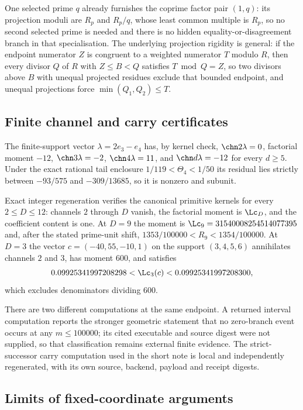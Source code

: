 One selected prime $q$ already furnishes the coprime factor pair $(1,q)$: its
projection moduli are $R_p$ and $R_p/q$, whose least common multiple is
$R_p$, so no second selected prime is needed and there is no hidden
equality-or-disagreement branch in that specialisation.  The underlying
projection rigidity is general: if the endpoint numerator $Z$ is congruent to
a weighted numerator $T$ modulo $R$, then every divisor $Q$ of $R$ with
$Z\le B<Q$ satisfies $T\bmod Q=Z$, so two divisors above $B$ with unequal
projected residues exclude that bounded endpoint, and unequal projections
force $\min(Q_1,Q_2)\le T$.

\subsection{Finite channel and carry certificates}\label{long68:sec:ext-certificates}

The finite-support vector $\lambda=2e_3-e_4$ has, by kernel check,
$\chn2\lambda=0$, factorial moment $-12$, $\chn3\lambda=-2$,
$\chn4\lambda=11$, and $\chn d\lambda=-12$ for every $d\ge5$.  Under the
exact rational tail enclosure $1/119<\Theta_4<1/50$ its residual lies
strictly between $-93/575$ and $-309/13685$, so it is nonzero and subunit.

Exact integer regeneration verifies the canonical primitive kernels for every
$2\le D\le12$: channels $2$ through $D$ vanish, the factorial moment is
$\Lc_D$, and the coefficient content is one.  At $D=9$ the moment is
$\Lc_9=31540008254514077395$ and, after the stated prime-unit shift,
$1353/100000<R_9<1354/100000$.  At $D=3$ the vector $c=(-40,55,-10,1)$ on the
support $(3,4,5,6)$ annihilates channels $2$ and $3$, has moment $600$, and
satisfies
\[
 0.09925341997208298<\Lc_3(c)<0.09925341997208300 ,
\]
which excludes denominators dividing $600$.

There are two different computations at the same endpoint.  A returned
interval computation reports the stronger geometric statement that no
zero-branch event occurs at any $m\le100000$; its cited executable and source
digest were not supplied, so that classification remains external finite
evidence.  The strict-successor carry computation used in the short note is
local and independently regenerated, with its own source, backend, payload
and receipt digests.

\subsection{Limits of fixed-coordinate arguments}\label{long68:sec:ext-nogo}

